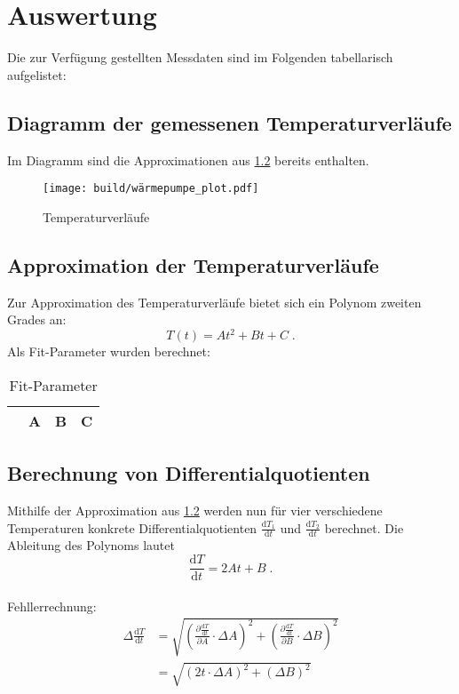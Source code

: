 \section{Auswertung} \label{sec:Auswertung}
Die zur Verfügung gestellten Messdaten sind im Folgenden tabellarisch aufgelistet:


\newpage
\subsection{Diagramm der gemessenen Temperaturverläufe} %
Im Diagramm sind die Approximationen aus \ref{sec:approx} bereits enthalten.

\begin{figure}
  \centering
  \texttt{[image: build/wärmepumpe\_plot.pdf]}
  \caption{Temperaturverläufe}
  \label{fig:plot}
\end{figure}

\subsection{Approximation der Temperaturverläufe} \label{sec:approx} %
Zur Approximation des Temperaturverläufe bietet sich ein Polynom zweiten Grades an:
\[
T(t) = At^2 + Bt + C \; .
\]
Als Fit-Parameter wurden berechnet:

\begin{table}
\centering
\caption{Fit-Parameter}
\label{tab:fit_params}
\begin{tabular}{c c c c}
\toprule
 & A & B & C \\
\midrule

\bottomrule
\end{tabular}
\end{table}

\subsection{Berechnung von Differentialquotienten} %
Mithilfe der Approximation aus \ref{sec:approx} werden nun für vier verschiedene Temperaturen konkrete  Differentialquotienten $\frac{\mathrm{d}T_1}{\mathrm{d}t}$ und $\frac{\mathrm{d}T_2}{\mathrm{d}t}$ berechnet.
Die Ableitung des Polynoms lautet
\[
\frac{\mathrm{d}T}{\mathrm{d}t} = 2At + B \; .
\]
\\
Fehllerrechnung:
\begin{align*}
  \Delta \frac{\mathrm{d}T}{\mathrm{d}t}
  &= \sqrt{\left(\frac{\partial \frac{\mathrm{d}T}{\mathrm{d}t}}{\partial A} \cdot \Delta A\right)^2 + \left(\frac{\partial \frac{\mathrm{d}T}{\mathrm{d}t}}{\partial B} \cdot \Delta B\right)^2} \\
  &= \sqrt{(2t \cdot \Delta A)^2 + (\Delta B)^2}
\end{align*}

